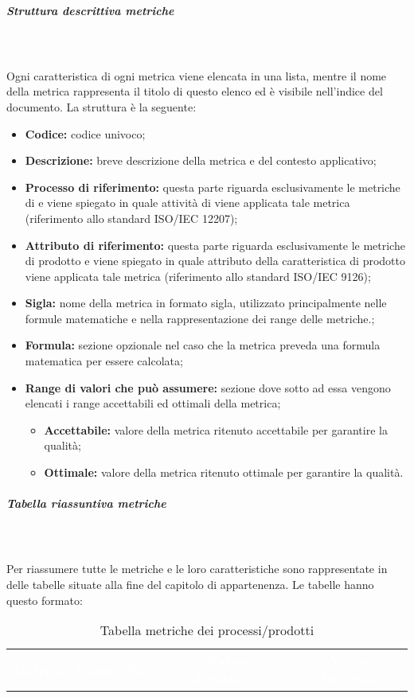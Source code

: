 \subparagraph{Struttura descrittiva metriche}\mbox{}\\ \\
Ogni caratteristica di ogni metrica viene elencata in una lista, mentre il nome della metrica rappresenta il titolo di questo elenco ed è visibile nell'indice del documento. La struttura è la seguente:
\begin{itemize}
    \item \textbf{Codice:} codice univoco;
    \item \textbf{Descrizione:} breve descrizione della metrica e del contesto applicativo;
    \item \textbf{Processo di riferimento:} questa parte riguarda esclusivamente le metriche di  e viene spiegato in quale attività di  viene applicata tale metrica (riferimento allo standard ISO/IEC 12207);
    \item \textbf{Attributo di riferimento:} questa parte riguarda esclusivamente le metriche di prodotto e viene spiegato in quale attributo della caratteristica di prodotto viene applicata tale metrica (riferimento allo standard ISO/IEC 9126);
    \item \textbf{Sigla:} nome della metrica in formato sigla, utilizzato principalmente nelle formule matematiche e nella rappresentazione dei range delle metriche.;
    \item \textbf{Formula:} sezione opzionale nel caso che la metrica preveda una formula matematica per essere calcolata;
    \item \textbf{Range di valori che può assumere:} sezione dove sotto ad essa vengono elencati i range accettabili ed ottimali della metrica;
    \begin{itemize}
        \item \textbf{Accettabile:} valore della metrica ritenuto accettabile per garantire la qualità;
        \item \textbf{Ottimale:} valore della metrica ritenuto ottimale per garantire la qualità.
    \end{itemize}
\end{itemize} 

\subparagraph{Tabella riassuntiva metriche}\mbox{}\\ \\
Per riassumere tutte le metriche e le loro caratteristiche sono rappresentate in delle tabelle situate alla fine del capitolo di appartenenza. Le tabelle hanno questo formato:

{
\renewcommand{\arraystretch}{1.5}
\begin{longtable}{ c C{4cm} c c c}
\caption{Tabella metriche dei processi/prodotti}\\
\textcolor{white}{\textbf{Metrica}} & \textcolor{white}{\textbf{Nome}} & \textcolor{white}{\textbf{Sigla}} & \textcolor{white}{\textbf{Valore Accettabile}} & \textcolor{white}{\textbf{Valore Ottimale}}\\
\end{longtable}
}

